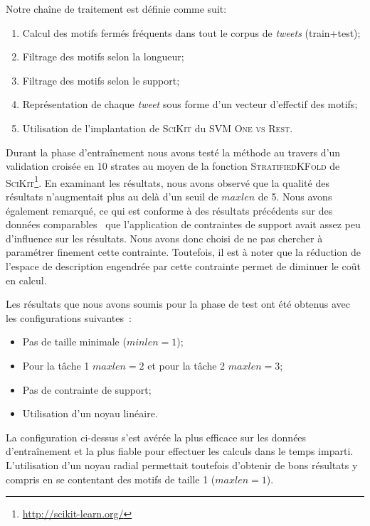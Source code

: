 Notre chaîne de traitement est définie comme suit:
\begin{enumerate}
  \item Calcul des motifs fermés fréquents dans tout le corpus de \textit{tweets} (train+test);
  \item Filtrage des motifs selon la longueur;
  \item Filtrage des motifs selon le support;
  \item Représentation de chaque \textit{tweet} sous forme d'un vecteur d'effectif des motifs;
  \item Utilisation de l'implantation de \textsc{SciKit} du SVM \textsc{One vs Rest}.
\end{enumerate}


Durant la phase d'entraînement nous avons testé la méthode au travers d'un validation croisée en 10 strates au moyen de la fonction \textsc{StratifiedKFold} de \textsc{SciKit}\footnote{\url{http://scikit-learn.org/}}.
 En examinant les résultats, nous avons observé que la qualité des résultats n'augmentait plus au delà d'un seuil de $maxlen$ de 5.
Nous avons également remarqué, ce qui est conforme à des résultats précédents sur des données comparables~\cite{Buscaldi-2017} que l'application de contraintes de support avait assez peu d'influence sur les résultats.
Nous avons donc choisi de ne pas chercher à paramétrer finement cette contrainte.
Toutefois, il est à noter que la réduction de l'espace de description engendrée par cette contrainte permet de diminuer le coût en calcul.

Les résultats que nous avons soumis pour la phase de test ont été obtenus avec les configurations suivantes~:
\begin{itemize}
  \item Pas de taille minimale ($minlen=1$);
  \item Pour la tâche 1 $maxlen=2$ et pour la tâche 2 $maxlen=3$;
  \item Pas de contrainte de support;
  \item Utilisation d'un noyau linéaire.
\end{itemize}

La configuration ci-dessus s'est avérée la plus efficace sur les données d'entraînement et la plus fiable pour effectuer les calculs dans le temps imparti.
L'utilisation d'un noyau radial permettait toutefois d'obtenir de bons résultats y compris en se contentant des motifs de taille 1 ($maxlen=1$).



